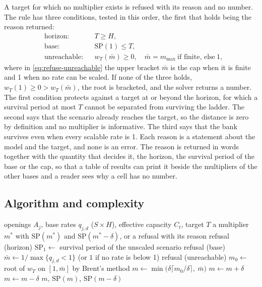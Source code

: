 A target for which no multiplier exists is refused with its reason and no number. The rule has three conditions, tested in this order, the first that holds being the reason returned:
\begin{align}
&\text{horizon:} && T\ge H, \label{eq:refuse-horizon}\\
&\text{base:} && \mathrm{SP}(1)\le T, \label{eq:refuse-base}\\
&\text{unreachable:} && w_T(\bar m)\ge 0,\quad \bar m=m_{\max}\ \text{if finite, else}\ 1, \label{eq:refuse-unreachable}
\end{align}
where in \cref{eq:refuse-unreachable} the upper bracket $\bar m$ is the cap when it is finite and 1 when no rate can be scaled. If none of the three holds, $w_T(1)\ge 0>w_T(\bar m)$, the root is bracketed, and the solver returns a number. The first condition protects against a target at or beyond the horizon, for which a survival period at most $T$ cannot be separated from surviving the ladder. The second says that the scenario already reaches the target, so the distance is zero by definition and no multiplier is informative. The third says that the bank survives even when every scalable rate is 1. Each reason is a statement about the model and the target, and none is an error. The reason is returned in words together with the quantity that decides it, the horizon, the survival period of the base or the cap, so that a table of results can print it beside the multipliers of the other bases and a reader sees why a cell has no number.

\subsection{Algorithm and complexity}

\begin{algorithm}[htbp]
\caption{Reverse liquidity stress with a refusal rule.}
\label{alg:reverse}
\begin{algorithmic}[1]
\Require openings $A_j$, base rates $q_{j,d}$ ($S\times H$), effective capacity $C_t$, target $T$
\Ensure a multiplier $m^\ast$ with $\mathrm{SP}(m^\ast)$ and $\mathrm{SP}(m^\ast-\delta)$, or a refusal with its reason
 \Return refusal (horizon) \EndIf
\State $\mathrm{SP}_1\gets$ survival period of the unscaled scenario
 \Return refusal (base) \EndIf
\State $\bar m\gets 1/\max\{q_{j,d}<1\}$ (or $1$ if no rate is below 1)
 \Return refusal (unreachable) \EndIf
\State $m_0\gets$ root of $w_T$ on $[1,\bar m]$ by Brent's method
\State $m\gets\min\bigl(\delta\lceil m_0/\delta\rceil,\ \bar m\bigr)$
 $m\gets m+\delta$ \EndWhile
{} $m\gets m-\delta$ \EndWhile
\State \Return $m$, $\mathrm{SP}(m)$, $\mathrm{SP}(m-\delta)$
\end{algorithmic}
\end{algorithm}

